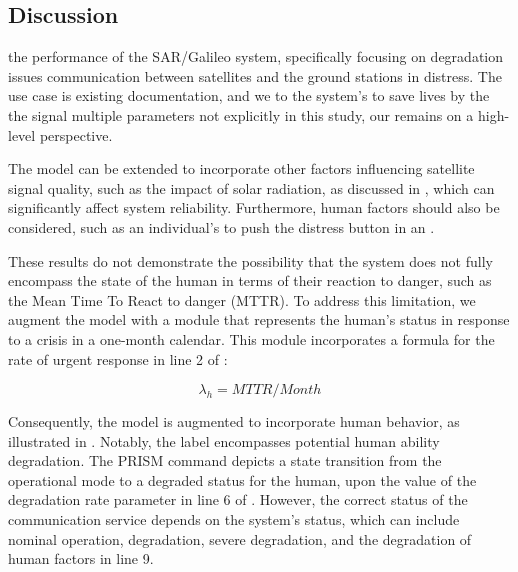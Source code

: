 \subsection{Discussion}
 the performance of the SAR/Galileo system, specifically focusing on degradation issues  communication between satellites and the ground stations  in distress. The use case is  existing documentation, and we  to  the system's  to save lives by  the   the signal  multiple parameters not explicitly  in this study, our  remains on a high-level perspective.

The model can be extended to incorporate other factors influencing satellite signal quality, such as the impact of solar radiation, as discussed in \cite{Hoque2015,baouya2024seaa}, which can significantly affect system reliability. Furthermore, human factors should also be considered, such as an individual's  to push the distress button in an . 

These results do not demonstrate the possibility that the system does not fully encompass the state of the human in terms of their reaction to danger, such as the Mean  Time To React to danger (MTTR). To address this limitation, we augment the model with a module that represents the human's status in response to a crisis in a one-month calendar. This module incorporates a formula for the rate of urgent response in line 2 of : 

\begin{equation*}
\lambda_{h} = MTTR / Month 
\end{equation*}

Consequently, the model is augmented to incorporate human behavior, as illustrated in . Notably, the label  encompasses potential human ability degradation. The PRISM command depicts a state transition from the operational mode to a degraded status for the human, upon the value of the degradation rate parameter  in line 6 of . However, the correct status of the communication service depends on the system's status, which can include nominal operation, degradation, severe degradation, and the degradation of human factors in line 9.

